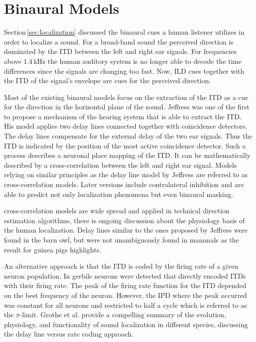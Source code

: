 \section{Binaural Models}
\label{sec:binaural_models}
%
Section\,\ref{sec:localization} discussed the binaural cues a human listener
utilizes in order to localize a sound. For a broad-band sound the perceived
direction is dominated by the \ac{ITD} between the left and right
ear signals. For frequencies above $1.4$\,kHz the human auditory system is no
longer able to decode the time differences since the signals are changing too
fast. Now, \ac{ILD} cues together with the \ac{ITD} of the signal's envelope are
cues for the perceived direction.

Most of the existing binaural models focus on the extraction of
the \ac{ITD} as a cue for the direction in the horizontal plane of the sound.
Jeffress was one
of the first to propose a mechanism of the hearing system that is able to
extract the \ac{ITD}.\autocite{Jeffress1948}
His model applies two delay lines connected together with coincidence detectors.
The delay lines compensate for the external delay
of the two ear signals. Thus the \ac{ITD} is indicated by the position of the
most active coincidence detector. Such a process describes a neuronal place
mapping of the \ac{ITD}. 
It can be mathematically described by a cross-correlation between the left and
right ear signal. Models relying on similar principles as the delay line model
by Jeffress are referred to as cross-correlation models. Later versions
include contralateral inhibition and are able to
predict not only localization phenomena but even binaural masking.\autocite{Breebaart2001}

 cross-correlation models are wide spread and applied in
technical direction estimation algorithms, there is
ongoing discussion about the physiology basis of the human localization.
Delay lines similar to the ones proposed by Jeffress were found in the
barn owl, but were not unambiguously found in mammals as the
result for guinea pigs highlights.\autocite{McAlpine2001}

An alternative approach is that the \ac{ITD} is coded by the firing
rate of a given neuron population. In gerbils neurons were detected that
directly encoded
\acp{ITD} with their firing rate.\autocite{Brand2002}
The peak of the
firing rate function for the \ac{ITD} depended on the best frequency of the
neuron. However, the \ac{IPD} where the peak occurred was constant for all neurons
and restricted to half a cycle which is referred to as the
$\pi$-limit.
Grothe et al.\autocite{Grothe2010} provide a compelling summary of the
evolution, physiology, and functionality of sound localization in different
species, discussing the delay line versus rate coding approach.

